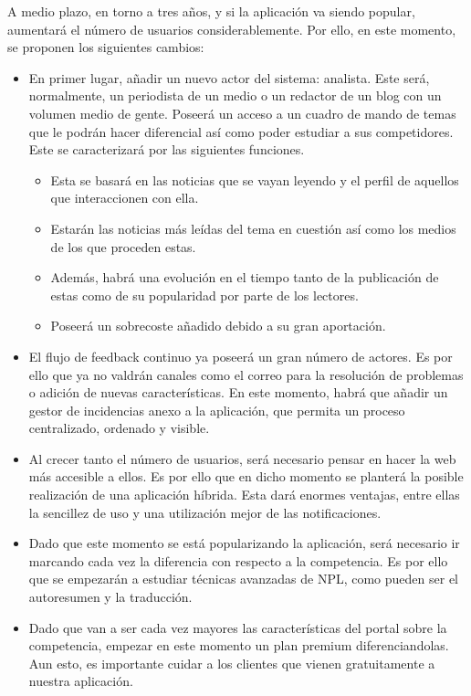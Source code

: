 A medio plazo, en torno a tres años, y si la aplicación va siendo popular, aumentará el número de usuarios considerablemente. Por ello, en este momento, se proponen los siguientes cambios:

\begin{itemize}
    \item En primer lugar, añadir un nuevo actor del sistema: analista. Este será, normalmente, un periodista de un medio o un redactor de un blog con un volumen medio de gente. Poseerá un acceso a un cuadro de mando de temas que le podrán hacer diferencial así como poder estudiar a sus competidores. Este se caracterizará por las siguientes funciones.
    \begin{itemize}
        \item Esta se basará en las noticias que se vayan leyendo y el perfil de aquellos que interaccionen con ella.
        \item Estarán las noticias más leídas del tema en cuestión así como los medios de los que proceden estas.
        \item Además, habrá una evolución en el tiempo tanto de la publicación de estas como de su popularidad por parte de los lectores.
        \item Poseerá un sobrecoste añadido debido a su gran aportación.
    \end{itemize}
    \item El flujo de feedback continuo ya poseerá un gran número de actores. Es por ello que ya no valdrán canales como el correo para la resolución de problemas o adición de nuevas características. En este momento, habrá que añadir un gestor de incidencias anexo a la aplicación, que permita un proceso centralizado, ordenado y visible.
    \item Al crecer tanto el número de usuarios, será necesario pensar en hacer la web más accesible a ellos. Es por ello que en dicho momento se planterá la posible realización de una aplicación híbrida. Esta dará enormes ventajas, entre ellas la sencillez de uso y una utilización mejor de las notificaciones.
    \item Dado que este momento se está popularizando la aplicación, será necesario ir marcando cada vez la diferencia con respecto a la competencia. Es por ello que se empezarán a estudiar técnicas avanzadas de NPL, como pueden ser el autoresumen y la traducción.
    \item Dado que van a ser cada vez mayores las características del portal sobre la competencia, empezar en este momento un plan premium diferenciandolas. Aun esto, es importante cuidar a los clientes que vienen gratuitamente a nuestra aplicación.
\end{itemize}

